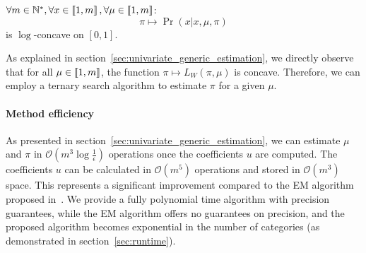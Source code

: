\begin{conjecture}
    $\forall m \in \mathbb{N}^*, \forall x \in \left\llbracket1, m\right\rrbracket, \forall \mu \in \left\llbracket1, m\right\rrbracket$:
    \[\pi \mapsto \Pr(x | x, \mu, \pi) \] 
    is $\log$-concave on $[0, 1]$.
\end{conjecture}

As explained in section~\ref{sec:univariate_generic_estimation}, we directly observe that for all $\mu \in \left\llbracket1, m\right\rrbracket$, the function $\pi \mapsto L_W(\pi, \mu)$ is concave. Therefore, we can employ a ternary search algorithm to estimate $\pi$ for a given $\mu$.

\paragraph{Method efficiency}

As presented in section~\ref{sec:univariate_generic_estimation}, we can estimate $\mu$ and $\pi$ in $\mathcal O(m^3 \log \frac{1}{\epsilon})$ operations once the coefficients $u$ are computed. The coefficients $u$ can be calculated in $\mathcal O(m^5)$ operations and stored in $\mathcal O(m^3)$ space. This represents a significant improvement compared to the EM algorithm proposed in~\cite{biernacki2016model}. We provide a fully polynomial time algorithm with precision guarantees, while the EM algorithm offers no guarantees on precision, and the proposed algorithm becomes exponential in the number of categories (as demonstrated in section~\ref{sec:runtime}).




